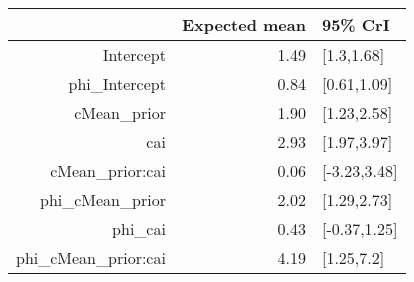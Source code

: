 \begin{tabular}{rrl}
  \hline
 & Expected mean & 95\% CrI \\ 
  \hline
Intercept & 1.49 & [1.3,1.68] \\ 
  phi\_Intercept & 0.84 & [0.61,1.09] \\ 
  cMean\_prior & 1.90 & [1.23,2.58] \\ 
  cai & 2.93 & [1.97,3.97] \\ 
  cMean\_prior:cai & 0.06 & [-3.23,3.48] \\ 
  phi\_cMean\_prior & 2.02 & [1.29,2.73] \\ 
  phi\_cai & 0.43 & [-0.37,1.25] \\ 
  phi\_cMean\_prior:cai & 4.19 & [1.25,7.2] \\ 
   \hline
\end{tabular}

